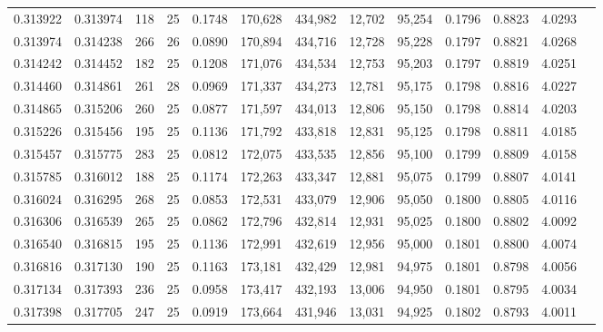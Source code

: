 \begin{tabular}{rrrrrrrrrrrrr}
0.313922 & 0.313974 &   118 &  25 &                                     0.1748 & 170,628 & 434,982 &  12,702 &  95,254 & 0.1796 & 0.8823 & 4.0293 \\
0.313974 & 0.314238 &   266 &  26 &                                     0.0890 & 170,894 & 434,716 &  12,728 &  95,228 & 0.1797 & 0.8821 & 4.0268 \\
0.314242 & 0.314452 &   182 &  25 &                                     0.1208 & 171,076 & 434,534 &  12,753 &  95,203 & 0.1797 & 0.8819 & 4.0251 \\
0.314460 & 0.314861 &   261 &  28 &                                     0.0969 & 171,337 & 434,273 &  12,781 &  95,175 & 0.1798 & 0.8816 & 4.0227 \\
0.314865 & 0.315206 &   260 &  25 &                                     0.0877 & 171,597 & 434,013 &  12,806 &  95,150 & 0.1798 & 0.8814 & 4.0203 \\
0.315226 & 0.315456 &   195 &  25 &                                     0.1136 & 171,792 & 433,818 &  12,831 &  95,125 & 0.1798 & 0.8811 & 4.0185 \\
0.315457 & 0.315775 &   283 &  25 &                                     0.0812 & 172,075 & 433,535 &  12,856 &  95,100 & 0.1799 & 0.8809 & 4.0158 \\
0.315785 & 0.316012 &   188 &  25 &                                     0.1174 & 172,263 & 433,347 &  12,881 &  95,075 & 0.1799 & 0.8807 & 4.0141 \\
0.316024 & 0.316295 &   268 &  25 &                                     0.0853 & 172,531 & 433,079 &  12,906 &  95,050 & 0.1800 & 0.8805 & 4.0116 \\
0.316306 & 0.316539 &   265 &  25 &                                     0.0862 & 172,796 & 432,814 &  12,931 &  95,025 & 0.1800 & 0.8802 & 4.0092 \\
0.316540 & 0.316815 &   195 &  25 &                                     0.1136 & 172,991 & 432,619 &  12,956 &  95,000 & 0.1801 & 0.8800 & 4.0074 \\
0.316816 & 0.317130 &   190 &  25 &                                     0.1163 & 173,181 & 432,429 &  12,981 &  94,975 & 0.1801 & 0.8798 & 4.0056 \\
0.317134 & 0.317393 &   236 &  25 &                                     0.0958 & 173,417 & 432,193 &  13,006 &  94,950 & 0.1801 & 0.8795 & 4.0034 \\
0.317398 & 0.317705 &   247 &  25 &                                     0.0919 & 173,664 & 431,946 &  13,031 &  94,925 & 0.1802 & 0.8793 & 4.0011 \\

\end{tabular}
